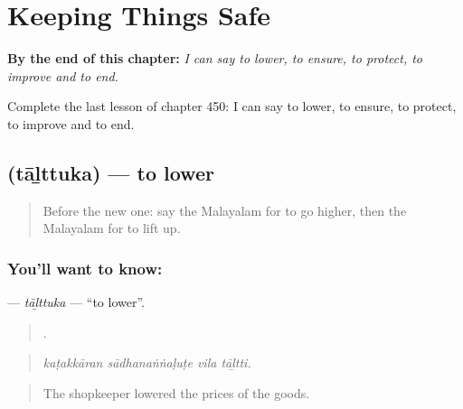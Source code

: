 
\chapter{Keeping Things Safe}
\label{ch:ml-keeping-things-safe}

\begin{chapteropening}
\textbf{By the end of this chapter:} \emph{I can say to lower, to ensure, to protect, to improve and to end.}

Complete the last lesson of chapter 450: I can say to lower, to ensure, to protect, to improve and to end.
\end{chapteropening}

\section[\texorpdfstring{\ml{താഴ്ത്തുക} (tāḻttuka)}{താഴ്ത്തുക (tāḻttuka)}]{ (tāḻttuka) — to lower}

\label{lesson:ML-C450-talttuka}



\begin{quote}
Before the new one: say the Malayalam for to go higher, then the Malayalam for to lift up.
\end{quote}

\subsection*{You'll want to know: }
\textbf{} — \emph{tāḻttuka} — \textquotedblleft{}to lower\textquotedblright{}.

\begin{quote}
   .
\end{quote}

\begin{quote}
\emph{kaṭakkāran sādhanaṅṅaḷuṭe vila tāḻtti.}
\end{quote}

\begin{quote}
The shopkeeper lowered the prices of the goods.
\end{quote}

